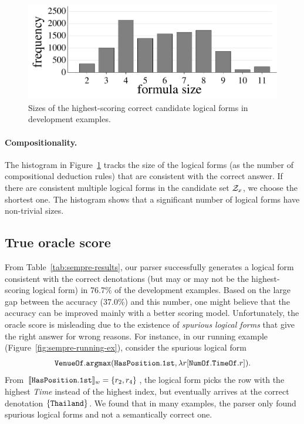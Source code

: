 \begin{figure}[t]
\centering
\includegraphics[scale=0.45]{sfig/sempre.slides/predCountHistogram.pdf}
\caption{
Sizes of the highest-scoring correct candidate logical forms in development examples.
}
\label{fig:sempre-lf-size}
\end{figure}

\paragraph{Compositionality.}
The histogram in Figure~\ref{fig:sempre-lf-size}
tracks the size of the logical forms
(as the number of compositional deduction rules)
that are consistent with the correct answer.
If there are consistent multiple logical forms in
the candidate set $\mathcal{Z}_x$, we choose the shortest one.
The histogram shows that a significant number of logical forms
have non-trivial sizes.

\subsection{True oracle score}
\label{sec:sempre-true-oracle}

From Table~\ref{tab:sempre-results},
our parser successfully generates a logical form
consistent with the correct denotations 
(but may or may not be the highest-scoring logical form)
in 76.7\% of the development examples.
Based on
the large gap between the accuracy (37.0\%) and this number,
one might believe that the accuracy can be improved
mainly with a better scoring model.
Unfortunately, the oracle score is misleading
due to the existence of \emph{spurious logical forms}
that give the right answer for wrong reasons.
For instance, in our running example (Figure~\ref{fig:sempre-running-ex}),
consider the spurious logical form
\begin{equation}
{\texttt{Venue}}\texttt{Of}.\texttt{argmax}(\texttt{Has}{\texttt{Position}}.\texttt{1st},
\lambda r[{\texttt{Num}}\texttt{Of}.{\texttt{Time}}\texttt{Of}.r]).
\end{equation}
From $\llbracket{\texttt{Has}{\texttt{Position}}.\texttt{1st}}\rrbracket_{w} = \{r_2, r_4\}$,
the logical form picks the row with the highest \emph{Time}
instead of the highest index,
but eventually arrives at the 
correct denotation $\{\texttt{Thailand}\}$.
We found that in many examples,
the parser only found spurious logical forms
and not a semantically correct one.


